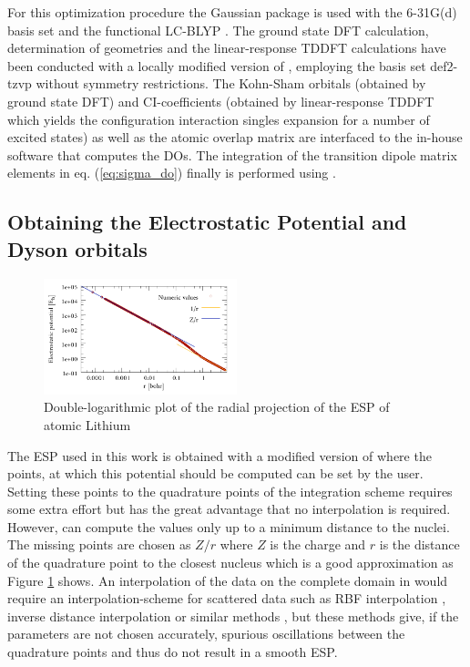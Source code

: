 For this optimization procedure the Gaussian package  \cite{g09} is used with the 6-31G(d) \cite{6-31g,6-31gd} basis set and the functional LC-BLYP \cite{lcblyp}. 
The ground state DFT calculation, determination of geometries and the linear-response TDDFT calculations have been conducted with a locally modified version of  \cite{nwchem}, employing the basis set def2-tzvp \cite{def2tzvp} without symmetry restrictions.
The Kohn-Sham orbitals (obtained by ground state DFT) and CI-coefficients (obtained by linear-response TDDFT which yields the configuration interaction singles expansion for a number of excited states) as well as the atomic overlap matrix are interfaced to the in-house software  \cite{MAgg} that computes the DOs.
The integration of the transition dipole matrix elements in eq. (\ref{eq:sigma_do}) finally is performed using  \cite{ezDyson}.

\subsection{Obtaining the Electrostatic Potential and Dyson orbitals}
\begin{figure}
\includegraphics[width=0.5\textwidth]{Figures/ESP}
\caption{Double-logarithmic plot of the radial projection of the ESP of atomic Lithium}
\label{fig:esp}
\end{figure}
The ESP used in this work is obtained with a modified version of  \cite{nwchem} where the points, at which this potential should be computed can be set by the user.
Setting these points to the quadrature points of the integration scheme requires some extra effort but has the great advantage that no interpolation is required.
However,  can compute the values only up to a minimum distance to the nuclei.
The missing points are chosen as $Z/r$ where $Z$ is the charge and $r$ is the distance of the quadrature point to the closest nucleus which is a good approximation as Figure \ref{fig:esp} shows.
An interpolation of the data on the complete domain in  \cite{FreeWilly} would require an interpolation-scheme for scattered data such as RBF interpolation \cite{rbfSE,rbfInterpol,rbfSurf}, inverse distance interpolation \cite{adapt_idw,idw} or similar methods \cite{CompInterp,idw_krieging,interpol}, but these methods give, if the parameters are not chosen accurately, spurious oscillations between the quadrature points and thus do not result in a smooth ESP.

